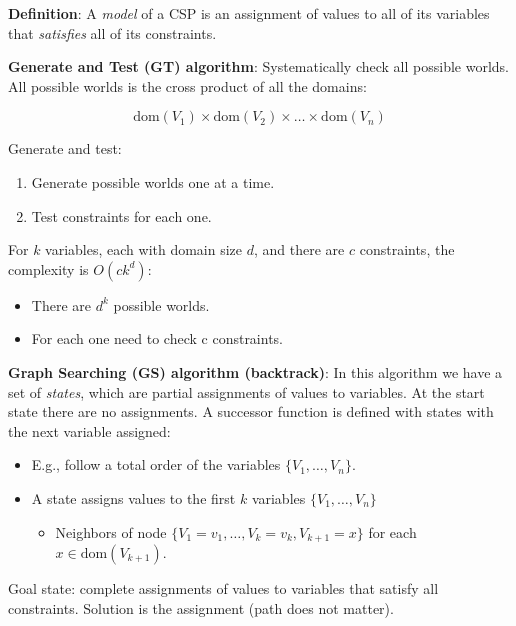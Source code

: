 \documentclass[11pt]{article}
\providecommand{\tightlist}{%
      \setlength{\itemsep}{0pt}\setlength{\parskip}{0pt}}
\begin{document}
\textbf{Definition}: A \emph{model} of a CSP is an assignment of values
to all of its variables that \emph{satisfies} all of its constraints.

\textbf{Generate and Test (GT) algorithm}: Systematically check all
possible worlds. All possible worlds is the cross product of all the
domains:

\[ \textrm{dom}(V_1) \times \textrm{dom}(V_2) \times \ldots \times \textrm{dom}(V_n) \]

Generate and test:

\begin{enumerate}
\def\labelenumi{\arabic{enumi}.}
\tightlist
\item
  Generate possible worlds one at a time.
\item
  Test constraints for each one.
\end{enumerate}

For \(k\) variables, each with domain size \(d\), and there are \(c\)
constraints, the complexity is \(O(ck^d)\):

\begin{itemize}
\tightlist
\item
  There are \(d^k\) possible worlds.
\item
  For each one need to check c constraints.
\end{itemize}

\textbf{Graph Searching (GS) algorithm (backtrack)}: In this algorithm
we have a set of \emph{states}, which are partial assignments of values
to variables. At the start state there are no assignments. A successor
function is defined with states with the next variable assigned:

\begin{itemize}
\tightlist
\item
  E.g., follow a total order of the variables \(\{V_1,\ldots,V_n\}\).
\item
  A state assigns values to the first \(k\) variables
  \(\{V_1,\ldots,V_n\}\)

  \begin{itemize}
  \tightlist
  \item
    Neighbors of node \(\{V_1 = v_1, \ldots, V_k=v_k, V_{k+1}=x\}\) for
    each \(x \in \textrm{dom}(V_{k+1})\).
  \end{itemize}
\end{itemize}

Goal state: complete assignments of values to variables that satisfy all
constraints. Solution is the assignment (path does not matter).
\end{document}
